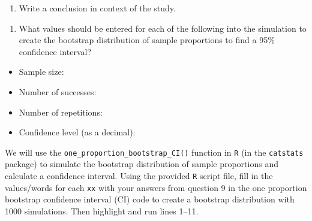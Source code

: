 \documentclass[
]{report}
\providecommand{\tightlist}{%
  \setlength{\itemsep}{0pt}\setlength{\parskip}{0pt}}
\begin{document}
\vspace{1in}

\begin{enumerate}
\def\labelenumi{\arabic{enumi}.}
\setcounter{enumi}{8}
\tightlist
\item
  Write a conclusion in context of the study.
\end{enumerate}

\vspace{1in}

\begin{enumerate}
\def\labelenumi{\arabic{enumi}.}
\setcounter{enumi}{9}
\tightlist
\item
  What values should be entered for each of the following into the simulation to create the bootstrap distribution of sample proportions to find a 95\% confidence interval?
  \vspace{1mm}
\end{enumerate}

\begin{itemize}
\tightlist
\item
  Sample size:
\end{itemize}

\vspace{.1in}

\begin{itemize}
\tightlist
\item
  Number of successes:
\end{itemize}

\vspace{.1in}

\begin{itemize}
\tightlist
\item
  Number of repetitions:
\end{itemize}

\vspace{.1in}

\begin{itemize}
\tightlist
\item
  Confidence level (as a decimal):
\end{itemize}

\vspace{.1in}

We will use the \texttt{one\_proportion\_bootstrap\_CI()} function in \texttt{R} (in the \texttt{catstats} package) to simulate the bootstrap distribution of sample proportions and calculate a confidence interval. Using the provided \texttt{R} script file, fill in the values/words for each \texttt{xx} with your answers from question 9 in the one proportion bootstrap confidence interval (CI) code to create a bootstrap distribution with 1000 simulations. Then highlight and run lines 1--11.
\end{document}
